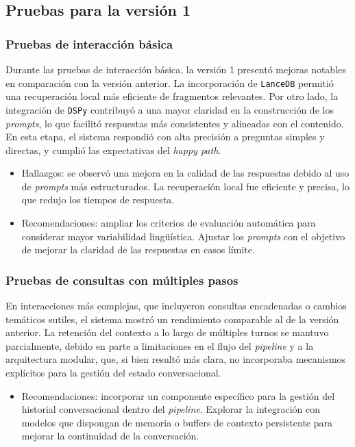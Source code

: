 \subsection{Pruebas para la versión 1}
\label{sec:resultadosPruebasV1}

\subsubsection{Pruebas de interacción básica}

Durante las pruebas de interacción básica, la versión 1 presentó mejoras notables en comparación con la versión anterior. La incorporación de \texttt{LanceDB} permitió una recuperación local más eficiente de fragmentos relevantes. Por otro lado, la integración de \texttt{DSPy} contribuyó a una mayor claridad en la construcción de los \textit{prompts}, lo que facilitó respuestas más consistentes y alineadas con el contenido. En esta etapa, el sistema respondió con alta precisión a preguntas simples y directas, y cumplió las expectativas del \textit{happy path}.

\begin{itemize}
    \item Hallazgos: se observó una mejora en la calidad de las respuestas debido al uso de \textit{prompts} más estructurados. La recuperación local fue eficiente y precisa, lo que redujo los tiempos de respuesta.
    \item Recomendaciones: ampliar los criterios de evaluación automática para considerar mayor variabilidad lingüística. Ajustar los \textit{prompts} con el objetivo de mejorar la claridad de las respuestas en casos límite.
\end{itemize}

\subsubsection{Pruebas de consultas con múltiples pasos}

En interacciones más complejas, que incluyeron consultas encadenadas o cambios temáticos sutiles, el sistema mostró un rendimiento comparable al de la versión anterior. La retención del contexto a lo largo de múltiples turnos se mantuvo parcialmente, debido en parte a limitaciones en el flujo del \textit{pipeline} y a la arquitectura modular, que, si bien resultó más clara, no incorporaba mecanismos explícitos para la gestión del estado conversacional.

\begin{itemize}
    \item Recomendaciones: incorporar un componente específico para la gestión del historial conversacional dentro del \textit{pipeline}. Explorar la integración con modelos que dispongan de memoria o buffers de contexto persistente para mejorar la continuidad de la conversación.
\end{itemize}

